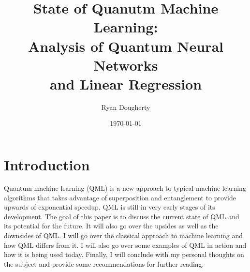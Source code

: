 \documentclass[12pt]{article}
\title{State of Quanutm Machine Learning:\\
\large Analysis of Quantum Neural Networks\\ 
and Linear Regression}
\author{Ryan Dougherty}
\date{\today}
\begin{document}
\maketitle

\section*{Introduction}
Quantum machine learning (QML) is a new approach to typical machine learning algorithms that takes advantage of superposition and entanglement to provide upwards of exponential speedup. QML is still in very early stages of its development. The goal of this paper is to discuss the current state of QML and its potential for the future. It will also go over the upsides as well as the downsides of QML. I will go over the classical approach to machine learning and how QML differs from it. I will also go over some examples of QML in action and how it is being used today. Finally, I will conclude with my personal thoughts on the subject and provide some recommendations for further reading.
\end{document}
